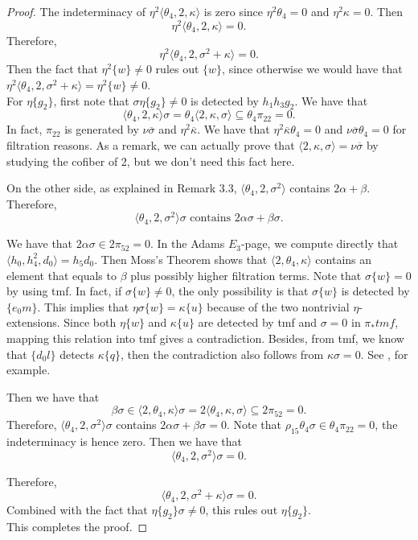 \documentclass[psamsfonts]{amsart}
\theoremstyle{definition}
\numberwithin{equation}{section}
\begin{document}
\begin{proof}
The indeterminacy of $\eta^2 \langle\theta_4, 2, \kappa\rangle$ is zero since $\eta^2\theta_4=0$ and $\eta^2\kappa=0$. Then
$$\eta^2 \langle\theta_4, 2, \kappa\rangle  =0.$$
Therefore,
$$\eta^2 \langle\theta_4, 2, \sigma^2+\kappa\rangle =0.$$
Then the fact that $\eta^2\{w\}\neq 0$ rules out $\{w\}$, since otherwise we would have that $\eta^2\langle\theta_4, 2, \sigma^2+\kappa\rangle = \eta^2 \{w\}\neq 0.$\\

For $\eta\{g_2\}$, first note that $\sigma\eta\{g_2\}\neq0$ is detected by $h_1h_3g_2$. We have that
$$\langle\theta_4, 2, \kappa\rangle \sigma = \theta_4 \langle 2, \kappa, \sigma\rangle \subseteq \theta_4\pi_{22} = 0.$$
In fact, $\pi_{22}$ is generated by $\nu\overline{\sigma}$ and $\eta^2\overline{\kappa}$. We have that $\eta^2\overline{\kappa}\theta_4=0$ and $\nu\overline{\sigma}\theta_4=0$ for filtration reasons. As a remark, we can actually prove that $\langle 2, \kappa, \sigma\rangle = \nu\overline{\sigma}$ by studying the cofiber of 2, but we don't need this fact here.

On the other side, as explained in Remark 3.3, $\langle\theta_4, 2, \sigma^2\rangle$ contains $2 \alpha + \beta.$ Therefore,
$$\langle\theta_4, 2, \sigma^2\rangle\sigma \text{~contains~} 2\alpha\sigma+\beta\sigma.$$

We have that $2\alpha\sigma \in 2 \pi_{52}=0$. In the Adams $E_3$-page, we compute directly that
$\langle h_0, h_4^2, d_0\rangle= h_5d_0$. Then Moss's Theorem shows that $\langle 2, \theta_4, \kappa\rangle$ contains an element that equals to $\beta$ plus possibly higher filtration terms. Note that $\sigma\{w\}=0$ by using tmf. In fact, if $\sigma\{w\}\neq 0$, the only possibility is that $\sigma\{w\}$ is detected by $\{e_0 m\}$. This implies that $\eta\sigma\{w\}=\kappa\{u\}$ because of the two nontrivial $\eta$-extensions. Since both $\eta\{w\}$ and $\kappa\{u\}$ are detected by tmf and $\sigma=0$ in $\pi_\ast tmf$, mapping this relation into tmf gives a contradiction. Besides, from tmf, we know that $\{d_0l\}$ detects $\kappa\{q\}$, then the contradiction also follows from $\kappa\sigma=0$. See \cite{Bau},\cite{He} for example. 

Then we have that
$$\beta\sigma \in \langle 2, \theta_4, \kappa\rangle \sigma = 2 \langle\theta_4, \kappa, \sigma\rangle \subseteq 2 \pi_{52}=0.$$
Therefore, $\langle\theta_4, 2, \sigma^2\rangle\sigma$ contains $2 \alpha\sigma + \beta\sigma=0$. Note that $\rho_{15}\theta_4\sigma\in\theta_4\pi_{22}=0$, the indeterminacy is hence zero. Then we have that
$$\langle\theta_4,2,\sigma^2\rangle\sigma=0.$$

Therefore,
$$\langle\theta_4,2,\sigma^2+\kappa\rangle\sigma=0. $$
Combined with the fact that $\eta\{g_2\}\sigma\neq 0$, this rules out $\eta\{g_2\}$.\\

This completes the proof.

\end{proof}
\end{document}
